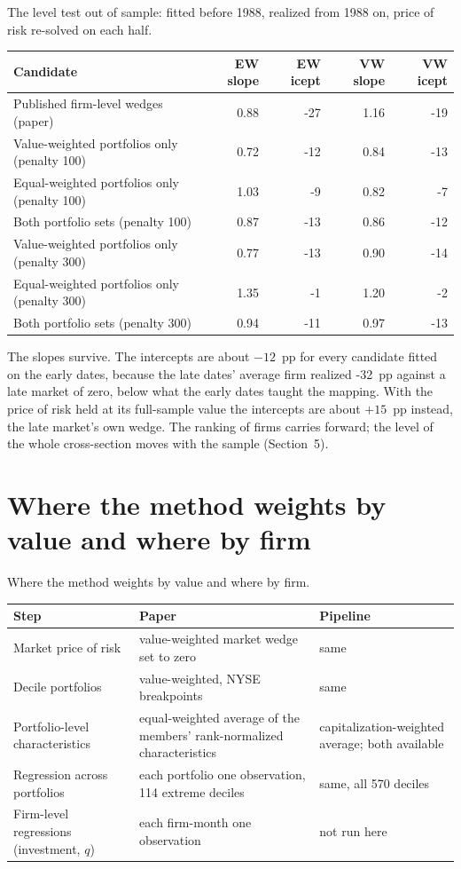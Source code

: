 \documentclass[11pt]{article}
\begin{document}
\begin{tbl}{The level test out of sample: fitted before 1988, realized from 1988 on, price of risk re-solved on each half.}
\begin{tabular}{lrrrr}\toprule
Candidate & EW slope & EW icept & VW slope & VW icept\\\midrule
Published firm-level wedges (paper) & 0.88 & -27 & 1.16 & -19\\
Value-weighted portfolios only (penalty 100) & 0.72 & -12 & 0.84 & -13\\
Equal-weighted portfolios only (penalty 100) & 1.03 & -9 & 0.82 & -7\\
Both portfolio sets (penalty 100) & 0.87 & -13 & 0.86 & -12\\
Value-weighted portfolios only (penalty 300) & 0.77 & -13 & 0.90 & -14\\
Equal-weighted portfolios only (penalty 300) & 1.35 & -1 & 1.20 & -2\\
Both portfolio sets (penalty 300) & 0.94 & -11 & 0.97 & -13\\
\bottomrule
\end{tabular}
\end{tbl}

The slopes survive. The intercepts are about $-12$~pp for every candidate
fitted on the early dates, because the late dates' average firm realized
-32~pp against a late market of zero, below what the early dates taught the
mapping. With the price of risk held at its full-sample value the intercepts
are about $+15$~pp instead, the late market's own wedge. The ranking of firms
carries forward; the level of the whole cross-section moves with the sample
(Section~5).

\section{Where the method weights by value and where by firm}

\begin{tbl}{Where the method weights by value and where by firm.}
\begin{tabular}{>{\raggedright\arraybackslash}p{4.6cm}>{\raggedright\arraybackslash}p{4.4cm}>{\raggedright\arraybackslash}p{4.4cm}}\toprule
Step & Paper & Pipeline\\\midrule
Market price of risk & value-weighted market wedge set to zero & same\\
Decile portfolios & value-weighted, NYSE breakpoints & same\\
Portfolio-level characteristics & equal-weighted average of the members' rank-normalized characteristics & capitalization-weighted average; both available\\
Regression across portfolios & each portfolio one observation, 114 extreme deciles & same, all 570 deciles\\
Firm-level regressions (investment, $q$) & each firm-month one observation & not run here\\
\bottomrule
\end{tabular}
\end{tbl}
\end{document}
